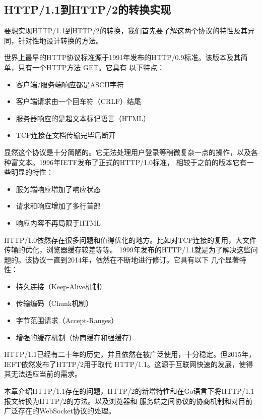 \documentclass[twoside]{CUGThesis}
\begin{document}
	\begin{spacing}{2}
		\section{HTTP/1.1到HTTP/2的转换实现}
	\end{spacing}
	要想实现HTTP/1.1到HTTP/2的转换，我们首先要了解这两个协议的特性及其异同，针对性地设计转换的方法。\par
	世界上最早的HTTP协议标准源于1991年发布的HTTP/0.9标准。该版本及其简单，只有一个HTTP方法 GET。它具有
	以下特点：
	\begin{itemize}
		\item 客户端/服务端响应都是ASCII字符
		\item 客户端请求由一个回车符（CRLF）结尾
		\item 服务器响应的是超文本标记语言（HTML）
		\item TCP连接在文档传输完毕后断开
	\end{itemize}
	\par
	显然这个协议是十分简陋的。它无法处理用户登录等稍微复杂一点的操作，以及各种富文本。1996年IETF发布了正式的HTTP/1.0标准，
	相较于之前的版本它有一些明显的特性：
	\begin{itemize}
		\item 服务端响应增加了响应状态
		\item 请求和响应增加了多行首部
		\item 响应内容不再局限于HTML
	\end{itemize}
	\par
	HTTP/1.0依然存在很多问题和值得优化的地方。比如对TCP连接的复用，大文件传输的优化，浏览器缓存较差等等。
	1999年发布的HTTP/1.1就是为了解决这些问题的。该协议一直到2014年，依然在不断地进行修订。它具有以下
	几个显著特性：
	\begin{itemize}
		\item 持久连接（Keep-Alive机制）
		\item 传输编码（Chunk机制）
		\item 字节范围请求（Accept-Ranges）
		\item 增强的缓存机制（协商缓存和强缓存）
	\end{itemize}
	\par
	HTTP/1.1已经有二十年的历史，并且依然在被广泛使用，十分稳定。但2015年，IEFT依然发布了HTTP/2用于取代
	HTTP/1.1。这源于互联网快速的发展，使得其无法适应当前的需求。\par 
	本章介绍HTTP/1.1存在的问题，HTTP/2的新增特性和在Go语言下将HTTP/1.1报文转换为HTTP/2的方法。以及浏览器和
	服务端之间协议的协商机制和对目前广泛存在的WebSocket协议的处理。
\end{document}
